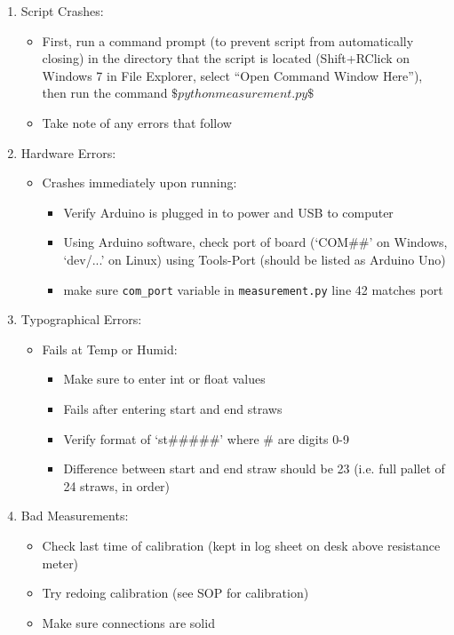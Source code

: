 \documentclass[letterpaper,12pt]{article}
\begin{document}
\begin{enumerate}
	\item Script Crashes:
	\begin{itemize}
		\item First, run a command prompt (to prevent script from automatically closing) in the directory that the script is located (Shift+RClick on Windows 7 in File Explorer, select “Open Command Window Here”), then run the command 
$ \$ python measurement.py \$ $
		\item Take note of any errors that follow
	\end{itemize}
	\item Hardware Errors:
	\begin{itemize}
		\item Crashes immediately upon running:
		\begin{itemize}
		\item Verify Arduino is plugged in to power and USB to computer
		\item Using Arduino software, check port of board (‘COM\#\#’ on Windows, ‘dev/...’ on Linux) using Tools-Port (should be listed as Arduino Uno)
		\item make sure \verb|com_port| variable in \verb|measurement.py| line 42 matches port
		\end{itemize}
	\end{itemize}
	\item Typographical Errors:
	\begin{itemize}
		\item Fails at Temp or Humid:
		\begin{itemize}
		\item Make sure to enter int or float values
		\item Fails after entering start and end straws
		\item Verify format of ‘st\#\#\#\#\#’ where \# are digits 0-9
		\item Difference between start and end straw should be 23 (i.e. full pallet of 24 straws, in order)
		\end{itemize}
	\end{itemize}
	\item Bad Measurements:
	\begin{itemize}
		\item Check last time of calibration (kept in log sheet on desk above resistance meter)
		\item Try redoing calibration (see SOP for calibration)
		\item Make sure connections are solid

\end{itemize}
\end{enumerate}
\end{document}
